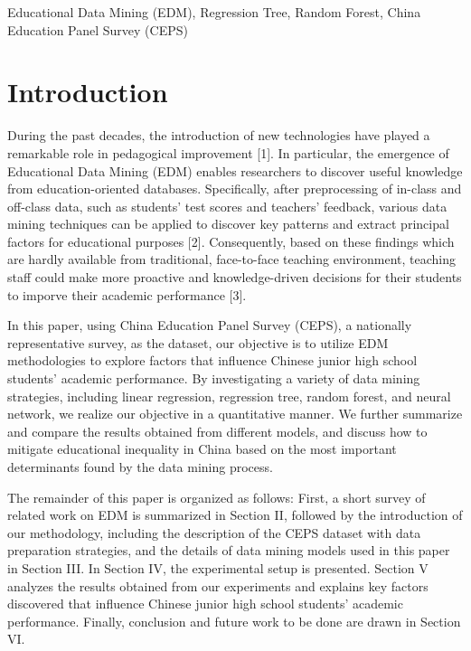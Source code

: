 \documentclass[conference]{IEEEtran}
\begin{document}
\begin{IEEEkeywords}
Educational Data Mining (EDM), Regression Tree, Random Forest, China Education Panel Survey (CEPS)
\end{IEEEkeywords}

\section{Introduction}
During the past decades, the introduction of new technologies have played a remarkable role in pedagogical improvement [1]. In particular, the emergence of Educational Data Mining (EDM) enables researchers to discover useful knowledge from education-oriented databases. Specifically, after preprocessing of in-class and off-class data, such as students' test scores and teachers' feedback, various data mining techniques can be applied to discover key patterns and extract principal factors for educational purposes [2]. Consequently, based on these findings which are hardly available from traditional, face-to-face teaching environment, teaching staff could make more proactive and knowledge-driven decisions for their students to imporve their academic performance [3]. 

In this paper, using China Education Panel Survey (CEPS), a nationally representative survey, as the dataset, our objective is to utilize EDM methodologies to explore factors that influence Chinese junior high school students' academic performance. By investigating a variety of data mining strategies, including linear regression, regression tree, random forest, and neural network, we realize our objective in a quantitative manner. We further summarize and compare the results obtained from different models, and discuss how to mitigate educational inequality in China based on the most important determinants found by the data mining process.

The remainder of this paper is organized as follows: First, a short survey of related work on EDM is summarized in Section II, followed by the introduction of our methodology, including the description of the CEPS dataset with data preparation strategies, and the details of data mining models used in this paper in Section III. In Section IV, the experimental setup is presented. Section V analyzes the results obtained from our experiments and explains key factors discovered that influence Chinese junior high school students' academic performance. Finally, conclusion and future work to be done are drawn in Section VI.           
\end{document}
